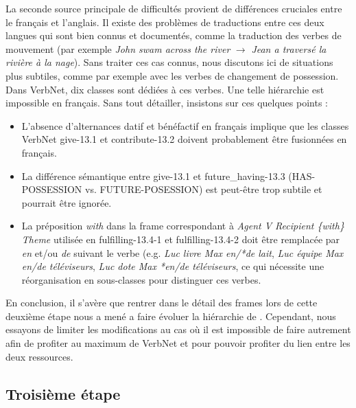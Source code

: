 La seconde source principale de difficultés provient de différences cruciales
entre le français et l'anglais. Il existe des problèmes de traductions entre
ces deux langues qui sont bien connus et documentés, comme la traduction des
verbes de mouvement (par exemple \emph{John swam across the river}
$\rightarrow$ \emph{Jean a traversé la rivière à la nage}). Sans traiter ces
cas connus, nous discutons ici de situations plus subtiles, comme par exemple
avec les verbes de changement de possession. Dans VerbNet, dix classes sont
dédiées à ces verbes. Une telle hiérarchie est impossible en français. Sans
tout détailler, insistons sur ces quelques points :

\begin{itemize}

    \item L'absence d'alternances datif et bénéfactif en français implique que
        les classes VerbNet {\color{blue}give-13.1} et
        {\color{blue}contribute-13.2} doivent probablement être fusionnées en
        français.

    \item La différence sémantique entre {\color{blue}give-13.1} et
        {\color{blue}future\_having-13.3} (HAS-POSSESSION vs. FUTURE-POSESSION)
        est peut-être trop subtile et pourrait être ignorée.

    \item La préposition \emph{with} dans la frame correspondant à \emph{Agent
        V Recipient \{with\} Theme} utilisée en {\color{blue}fulfilling-13.4-1}
        et {\color{blue}fulfilling-13.4-2} doit être remplacée par \emph{en}
        et/ou \emph{de} suivant le verbe (e.g. \emph{Luc livre Max en/*de
        lait}, \emph{Luc équipe Max en/de téléviseurs}, \emph{Luc dote Max
        *en/de téléviseurs}, ce qui nécessite une réorganisation en
        sous-classes pour distinguer ces verbes.

\end{itemize}

En conclusion, il s'avère que rentrer dans le détail des frames lors de cette
deuxième étape nous a mené a faire évoluer la hiérarchie de \verbenet{}.
Cependant, nous essayons de limiter les modifications au cas où il est
impossible de faire autrement afin de profiter au maximum de VerbNet et pour
pouvoir profiter du lien entre les deux ressources.

\subsection{Troisième étape}
\label{third}

